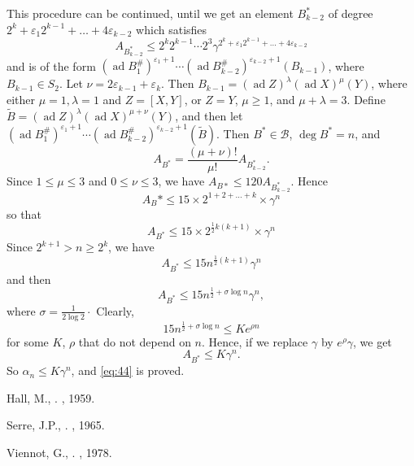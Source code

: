 \documentclass[leqno]{article}
\theoremstyle{plain}
\begin{document}
This procedure can be continued, until we get an element $B_{k-2}^{*}$ of degree $2^{k}+\varepsilon_{1} 2^{k-1}+\ldots+4 \varepsilon_{k-2}$ which satisfies
\begin{equation}
	A_{B_{k-2}^{*}} \leq 2^{k} 2^{k-1} \cdots 2^{3} \gamma^{2^{k}+\varepsilon_1 2^{k-1}+\ldots+4 \varepsilon_{k-2}}
\end{equation}
and is of the form $(\operatorname{ad} B_1^\#)^{\varepsilon_{1}+1} \dotsb (\operatorname{ad} B_{k-2}^\#)^{\varepsilon_{k-2}+1} \left(B_{k-1}\right)$, where $B_{k-1} \in S_{2}$. 
Let $\nu=2 \varepsilon_{k-1}+\varepsilon_{k}$. 
Then $B_{k-1}=(\operatorname{ad} Z)^{\lambda}(\operatorname{ad} X)^{\mu}(Y)$, where either $\mu=1, \lambda=1$ and $Z=[X, Y]$, or $Z=Y$, $\mu \geq 1$, and $\mu+\lambda=3$. Define $\tilde{B}=(\operatorname{ad} Z)^{\lambda}(\operatorname{ad} X)^{\mu+\nu}(Y)$, and then let $(\operatorname{ad} B_1^\#)^{\varepsilon_{1}+1} \dotsb (\operatorname{ad} B_{k-2}^\#)^{\varepsilon_{k-2}+1} \left(\tilde{B}\right)$. 
Then $B^{*} \in \mathcal{B}$, $\operatorname{deg} B^{*}=n$, and
\begin{equation}
	A_{B^*}=\frac{(\mu+\nu) !}{\mu !} A_{B^{*}_{k-2}}.
\end{equation}
Since $1 \leq \mu \leq 3$ and $0 \leq \nu \leq 3$, we have $A_{B*} \leq 120 A_{B^*_{k-2}}$. 
Hence
\begin{equation}
	A_{B} * \leq 15 \times 2^{1+2+\ldots+k} \times \gamma^n
\end{equation}
so that
\begin{equation}
	A_{B^{*}} \leq 15 \times 2^{\frac{1}{2} k(k+1)} \times \gamma^{n}
\end{equation}
Since $2^{k+1}>n \geq 2^{k}$, we have
\begin{equation}
	A_{B^{*}} \leq 15 n^{\frac{1}{2}(k+1)} \gamma^{n}
\end{equation}
and then
\begin{equation}
	A_{B^*} \leq 15 n^{\frac{1}{2}+\sigma \log n} \gamma^{n},
\end{equation}
where $\sigma=\frac{1}{2 \log 2} \cdot$ Clearly, 
\begin{equation}
	15 n^{\frac{1}{2}+\sigma \log n} \leq K e^{\rho n}
\end{equation}
for some $K$, $\rho$ that do not depend on $n$. Hence, if we replace $\gamma$ by $e^{\rho} \gamma$, we get
\begin{equation*}
	A_{B^*} \leq K \gamma^{n}.
\end{equation*}
So $\alpha_{n} \leq K \gamma^{n}$, and \eqref{eq:44} is proved.


\color{black}

\begin{thebibliography}{1}
	Hall, M.,
	.
	, 1959.
	
	Serre, J.P.,
	.
	, 1965.
	
	Viennot, G.,
	.
	, 1978.
\end{thebibliography}
\end{document}
